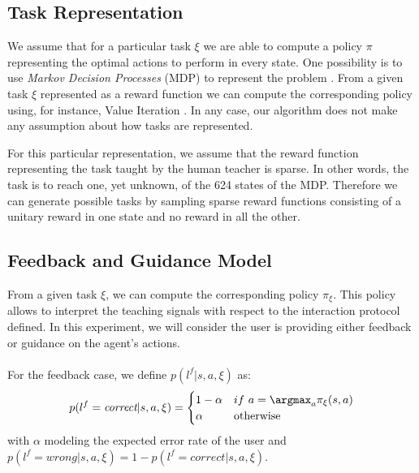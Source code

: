 \subsection{Task Representation}

We assume that for a particular task $\xi$ we are able to compute a policy $\pi$ representing the optimal actions to perform in every state. One possibility is to use \textit{Markov Decision Processes} (MDP) to represent the problem \cite{sutton1998reinforcement}. From a given task $\xi$ represented as a reward function we can compute the corresponding policy using, for instance, Value Iteration \cite{sutton1998reinforcement}. In any case, our algorithm does not make any assumption about how tasks are represented.

For this particular representation, we assume that the reward function representing the task taught by the human teacher is sparse. In other words, the task is to reach one, yet unknown, of the 624 states of the MDP. Therefore we can generate possible tasks by sampling sparse reward functions consisting of a unitary reward in one state and no reward in all the other.

\subsection{Feedback and Guidance Model}
\label{chapter:lfui:framemodels}

From a given task $\xi$, we can compute the corresponding policy $\pi_{\xi}$. This policy allows to interpret the teaching signals with respect to the interaction protocol defined. In this experiment, we will consider the user is providing either feedback or guidance on the agent's actions. 

\paragraph{} For the feedback case, we define $p(l^f |s,a,\xi)$ as:
%
\begin{equation}
    p(l^f = \emph{correct} |s,a,\xi) = 
    \begin{cases}
    1-\alpha               & if~a = \argmax_a \pi_{\xi}(s,a)\\
        \alpha             & \text{otherwise}\\
   \end{cases}
   \label{eq:feedbackframe}
\end{equation}
%
with $\alpha$ modeling the expected error rate of the user and $p(l^f = wrong |s,a,\xi) = 1 - p(l^f = correct |s,a,\xi)$.

